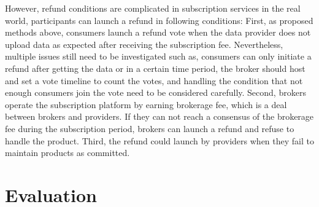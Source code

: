 \begin{spacing}{2.0}
However, refund conditions are complicated in subscription services in the real world, participants can launch a refund in following conditions: First, as proposed methods above, consumers launch a refund vote when the data provider does not upload data as expected after receiving the subscription fee. Nevertheless, multiple issues still need to be investigated such as, consumers can only initiate a refund after getting the data or in a certain time period, the broker should host and set a vote timeline to count the votes, and handling the condition that not enough consumers join the vote need to be considered carefully. Second, brokers operate the subscription platform by earning brokerage fee, which is a deal between brokers and providers. If they can not reach a consensus of the brokerage fee during the subscription period, brokers can launch a refund and refuse to handle the product. Third, the refund could launch by providers when they fail to maintain products as committed.

\end{spacing}

\clearpage
{}

\newpage
{}
\chapter{Evaluation}
\pagestyle{plain}

